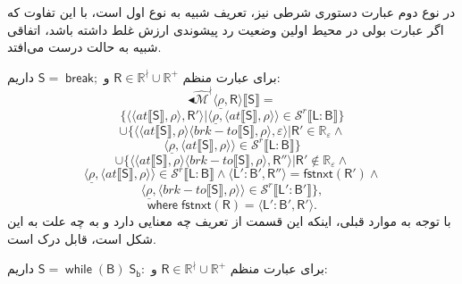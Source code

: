 در نوع دوم عبارت‌ دستوری شرطی نیز، تعریف شبیه به نوع اول است، با این تفاوت که اگر عبارت بولی در محیط اولین وضعیت رد پیشوندی ارزش غلط داشته باشد، اتفاقی شبیه به حالت درست می‌افتد.


 برای عبارت منظم 
 $\mathsf{R} \in \mathbb{R}^\nmid \cup \mathbb{R^+}$
 و 
 $\mathsf{S= \; break;}$
 داریم:
$$\blacktriangleleft \mathcal{\hat{M}^\nmid} \langle \underline{\rho}, \mathsf{R} \rangle 
\llbracket \mathsf{S} \rrbracket= $$
$$\{\langle \langle at \llbracket \mathsf{S} \rrbracket,\rho \rangle , \mathsf{R'} \rangle | \langle \underline{\rho} , \langle at \llbracket \mathsf{S} \rrbracket , \rho \rangle \rangle \in \mathcal{S}^r \llbracket \mathsf{L:B} \rrbracket\}$$
$$\cup \{ \langle \langle at \llbracket \mathsf{S} \rrbracket , \rho \rangle \langle brk-to \llbracket \mathsf{S} \rrbracket , \rho \rangle , \varepsilon \rangle | \mathsf{R'} \in \mathbb{R_\varepsilon} \land$$
$$\langle \underline{\rho}, \langle at \llbracket \mathsf{S} \rrbracket, \rho \rangle \rangle \in \mathcal{S}^r \llbracket \mathsf{L:B} \rrbracket \}$$
$$\cup \{ \langle \langle at \llbracket \mathsf{S} \rrbracket , \rho \rangle \langle brk-to \llbracket \mathsf{S} \rrbracket,\rho \rangle ,\mathsf{R''} \rangle | \mathsf{R'} \notin \mathbb{R_\varepsilon} \land$$
$$ \langle \underline{\rho},\langle at \llbracket \mathsf{S} \rrbracket , \rho \rangle \rangle \in \mathcal{S}^r \llbracket \mathsf{L:B} \rrbracket \land \langle \mathsf{L':B',R''} \rangle = \mathsf{fstnxt(R') \land}$$
$$\langle \underline{\rho}, \langle brk-to \llbracket \mathsf{S} \rrbracket, \rho \rangle \rangle \in \mathcal{S}^r \llbracket \mathsf{L':B'} \rrbracket \},$$
$$\mathsf{where\; fstnxt(R)=\langle L':B', R' \rangle}.$$
 با توجه به موارد قبلی، اینکه این قسمت از تعریف چه معنایی دارد و به چه علت به این شکل است، قابل درک است.
 
 برای عبارت منظم 
 $\mathsf{R} \in \mathbb{R}^\nmid \cup \mathbb{R^+}$
 و 
 $\mathsf{S= \; while \; (B) \; S_b:}$
 داریم:
 
